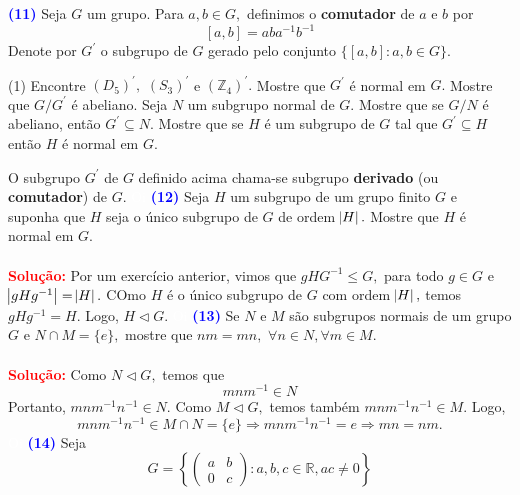 \documentclass[12pt, a4paper]{article}
\newcommand{\negrito}[1]{\mbox{\boldmath{$#1$}}}
\newcommand{\sol}{\textbf{\textcolor{red}{Solução:}} }
\begin{document}
\textcolor{blue}{\bf(11)}\label{49} Seja $G$ um grupo. Para $a,b \in G,$ definimos o \textbf{comutador} de $a$ e $b$ por
\[
[a,b] = aba^{-1}b^{-1}
\]
Denote por $G^{\prime}$ o subgrupo de $G$ gerado pelo conjunto $\{[a,b] : a,b \in G \}.$
\begin{tasks}[counter-format={(tsk[a])},label-width=3.6ex, label-format = {\bfseries}, column-sep = {0pt}](1)
\task[\textcolor{Floresta}{$\negrito{(a)} $}] Encontre $(D_5)^{\prime},$ $(S_3)^{\prime}$ e $(\mathbb{Z}_4)^{\prime}.$
\task[\textcolor{Floresta}{$\negrito{(b)} $}] Mostre que $G^{\prime}$ é normal em $G.$
\task[\textcolor{Floresta}{$\negrito{(c)} $}] Mostre que $G/G^{\prime}$ é abeliano.
\task[\textcolor{Floresta}{$\negrito{(d)} $}] Seja $N$ um subgrupo normal de $G.$ Mostre que se $G/N$ é abeliano, então $G^{\prime} \subseteq N.$
\task[\textcolor{Floresta}{$\negrito{(e)} $}] Mostre que se $H$ é um subgrupo de $G$ tal que $G^{\prime} \subseteq H$ então $H$ é normal em $G.$
\end{tasks}
O subgrupo $G^{\prime}$ de $G$ definido acima chama-se subgrupo \textbf{derivado} (ou \textbf{comutador}) de $G.$ 
\textcolor{white}{Oi}\newline\newline
\textcolor{blue}{\bf(12)}\label{50} Seja $H$ um subgrupo de um grupo finito $G$ e suponha que $H$ seja o único subgrupo de $G$ de ordem $\abs{H}.$ Mostre que $H$ é normal em $G.$\\ \\
\sol Por um exercício anterior, vimos que $gHG^{-1} \le G,$ para todo $g \in G$ e $\abs{gHg^{-1}} = \abs{H}.$ COmo $H$ é o único subgrupo de $G$ com ordem $\abs{H},$ temos $gHg^{-1} = H.$ Logo, $H \lhd G.$
\textcolor{white}{Oi}\newline\newline
\textcolor{blue}{\bf(13)}\label{51}  Se  $N$ e $M$ são subgrupos normais de um grupo $G$ e $N \cap M = \{e\},$ mostre que $nm = mn,$ $\forall n \in N, \forall m \in M.$\\ \\
\sol Como $N \lhd G,$ temos que
\[
mnm^{-1} \in N
\]
Portanto, $mnm^{-1}n^{-1} \in N.$
Como $M \lhd G,$ temos também $mnm^{-1}n^{-1} \in M.$ Logo, \[mnm^{-1}n^{-1} \in M \cap N = \{ e \} \Rightarrow mnm^{-1}n^{-1}  = e \Rightarrow mn = nm.\]
\textcolor{white}{Oi}\newline\newline
\textcolor{blue}{\bf(14)}\label{52} Seja 
\[
G = \left\{ \left(\begin{array}{cc} a & b \\ 0 & c \end{array}\right): a,b,c \in \mathbb{R}, ac \neq 0 \right\}
\]
\end{document}
